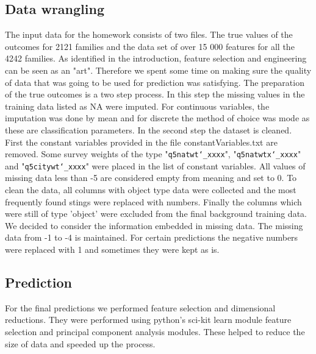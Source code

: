 \documentclass{article} %
\begin{document}
\subsection{Data wrangling}
The input data for the homework consists of two files. The true values of the outcomes for 2121 families and the data set of over 15 000 features for all the 4242 families. As identified in the introduction, feature selection and engineering can be seen as an "art". Therefore we spent some time on making sure the quality of data that was going to be used for prediction was satisfying. 
The preparation of the true outcomes is a two step process. In this step the missing values in the training data listed as NA were imputed. For continuous variables, the imputation was done by mean and for discrete the method of choice was mode as these are classification parameters. In the second step the dataset is cleaned. First the constant variables provided in the file {\selectfont constantVariables.txt} are removed. Some survey weights of the type "\texttt{q5natwt\char`_xxxx}", "\texttt{q5natwtx\char`_xxxx}" and "\texttt{q5citywt\char`_xxxx}" were placed in the list of constant variables. All values of missing data less than -5 are considered empty from meaning and set to 0. To clean the data, all columns with object type data were collected and the most frequently found stings were replaced with numbers. Finally the columns which were still of type 'object' were excluded from the final background training data. We decided to consider the information embedded in missing data. The missing data from -1 to -4 is maintained. For certain predictions the negative numbers were replaced with 1 and sometimes they were kept as is.
\subsection{Prediction}
For the final predictions we performed feature selection and dimensional reductions. They were performed using python's sci-kit learn module \cite{scikit-learn} feature selection and principal component analysis modules. These helped to reduce the size of data and speeded up the process.
\end{document}
